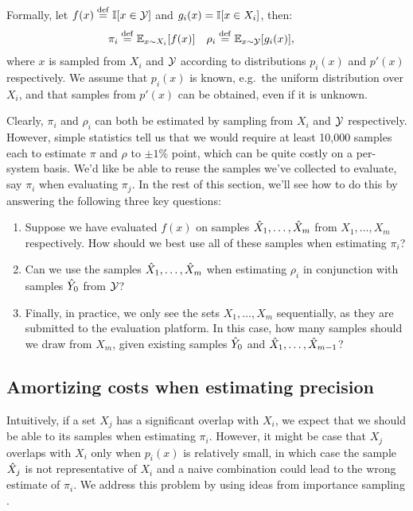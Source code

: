 Formally, let $f(x) \stackrel{\rm def}{=} \mathbb{I}[x \in \mathcal{Y}]$ and $g_i(x) = \mathbb{I}[x \in X_i]$, then:
\begin{align*}
  \pi_i  &\stackrel{\rm def}{=} \mathbb{E}_{x \sim X_i}[f(x)] &
  \rho_i &\stackrel{\rm def}{=} \mathbb{E}_{x \sim \mathcal{Y}}[g_i(x)],
\end{align*}
where $x$ is sampled from $X_i$ and $\mathcal{Y}$ according to distributions $p_i(x)$ and $p'(x)$ respectively.
We assume that $p_i(x)$ is known, e.g.\ the uniform distribution over $X_i$, and that samples from $p'(x)$ can be obtained, even if it is unknown.

Clearly, $\pi_i$ and $\rho_i$ can both be estimated by sampling from $X_i$ and $\mathcal{Y}$ respectively.
However, simple statistics tell us that we would require at least 10,000 samples each to estimate $\pi$ and $\rho$ to $\pm 1\%$ point, which can be quite costly on a per-system basis.
We'd like be able to reuse the samples we've collected to evaluate, say $\pi_i$ when evaluating $\pi_j$.
In the rest of this section, we'll see how to do this by answering the following three key questions:
\begin{enumerate}
  \item Suppose we have evaluated $f(x)$ on samples ${\hat{X}}_1, \ldots, {\hat{X}}_m$ from $X_1, \ldots, X_m$ respectively. How should we best use all of these samples when estimating $\pi_i$?
  \item Can we use the samples ${\hat{X}}_1, \ldots, {\hat{X}}_m$ when estimating $\rho_i$ in conjunction with samples ${\hat{Y}}_0$ from $\mathcal{Y}$?
  \item Finally, in practice, we only see the sets $X_1, \ldots, X_m$ sequentially, as they are submitted to the evaluation platform. In this case, how many samples should we draw from $X_m$, given existing samples ${\hat{Y}}_0$ and ${\hat{X}}_1, \ldots, {\hat{X}}_{m-1}$?
\end{enumerate}

\subsection{Amortizing costs when estimating precision}

Intuitively, if a set $X_j$ has a significant overlap with $X_i$, we expect that we should be able to its samples when estimating $\pi_i$.
However, it might be case that $X_j$ overlaps with $X_i$ only when $p_i(x)$ is relatively small, in which case the sample ${\hat{X}}_j$ is not representative of $X_i$ and a naive combination could lead to the wrong estimate of $\pi_i$.
We address this problem by using ideas from importance sampling \citep{owen}.

